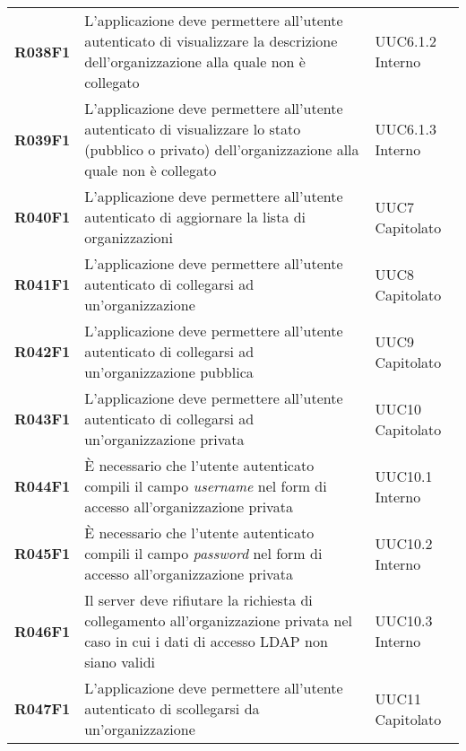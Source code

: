 \documentclass[../analisi-dei-requisiti.tex]{subfiles}
\begin{document}
\begin{longtable}[H]{>{\centering\bfseries}m{3cm} >{\centering}m{10cm} >{\centering\arraybackslash}m{3cm}}
  R038F1                               & L'applicazione deve permettere all'utente autenticato di visualizzare la descrizione dell'organizzazione alla quale non è collegato                                                                     & UUC6.1.2 Interno              \\
  R039F1                               & L'applicazione deve permettere all'utente autenticato di visualizzare lo stato (pubblico o privato) dell'organizzazione alla quale non è collegato                                                      & UUC6.1.3 Interno              \\
  R040F1                               & L'applicazione deve permettere all'utente autenticato di aggiornare la lista di organizzazioni                                                                                                          & UUC7 Capitolato               \\
  R041F1                               & L'applicazione deve permettere all'utente autenticato di collegarsi ad un'organizzazione                                                                                                                & UUC8 Capitolato               \\
  R042F1                               & L'applicazione deve permettere all'utente autenticato di collegarsi ad un'organizzazione pubblica                                                                                                       & UUC9 Capitolato               \\
  R043F1                               & L'applicazione deve permettere all'utente autenticato di collegarsi ad un'organizzazione privata                                                                                                        & UUC10 Capitolato              \\
  R044F1                               & È necessario che l'utente autenticato compili il campo \textit{username} nel form di accesso all'organizzazione privata                                                                                 & UUC10.1 Interno               \\
  R045F1                               & È necessario che l'utente autenticato compili il campo \textit{password} nel form di accesso all'organizzazione privata                                                                                 & UUC10.2 Interno               \\
  R046F1                               & Il server deve rifiutare la richiesta di collegamento all'organizzazione privata nel caso in cui i dati di accesso LDAP non siano validi                                                                & UUC10.3 Interno               \\
  R047F1                               & L'applicazione deve permettere all'utente autenticato di scollegarsi da un'organizzazione                                                                                                               & UUC11 Capitolato              \\


\end{longtable}
\end{document}
